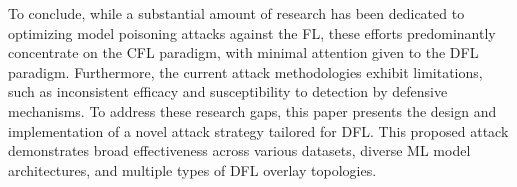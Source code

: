 To conclude, while a substantial amount of research has been dedicated to optimizing model poisoning attacks against the FL, these efforts predominantly concentrate on the CFL paradigm, with minimal attention given to the DFL paradigm. Furthermore, the current attack methodologies exhibit limitations, such as inconsistent efficacy and susceptibility to detection by defensive mechanisms. To address these research gaps, this paper presents the design and implementation of a novel attack strategy tailored for DFL. This proposed attack demonstrates broad effectiveness across various datasets, diverse ML model architectures, and multiple types of DFL overlay topologies.